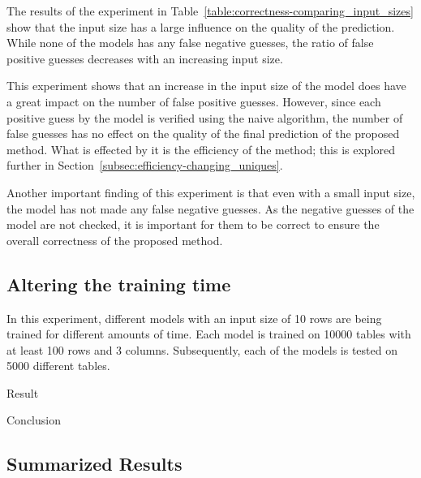 The results of the experiment in Table~\ref{table:correctness-comparing_input_sizes} show that the input size has a large influence on the quality of the prediction. While none of the models has any false negative guesses, the ratio of false positive guesses decreases with an increasing input size.

This experiment shows that an increase in the input size of the model does have a great impact on the number of false positive guesses. However, since each positive guess by the model is verified using the naive algorithm, the number of false guesses has no effect on the quality of the final prediction of the proposed method. What is effected by it is the efficiency of the method; this is explored further in Section~\ref{subsec:efficiency-changing_uniques}.

Another important finding of this experiment is that even with a small input size, the model has not made any false negative guesses. As the negative guesses of the model are not checked, it is important for them to be correct to ensure the overall correctness of the proposed method.




\subsection{Altering the training time}\label{subsec:correctness_comparing-training-time} %
In this experiment, different models with an input size of \num{10} rows are being trained for different amounts of time. Each model is trained on \num{10000} tables with at least \num{100} rows and \num{3} columns. Subsequently, each of the models is tested on \num{5000} different tables.

Result

Conclusion




\subsection{Summarized Results}\label{subsec:correctness_conclusions} %


